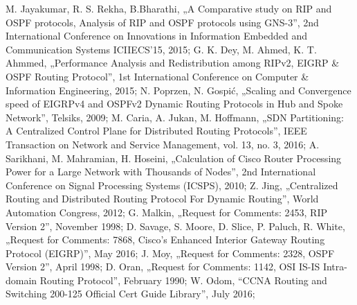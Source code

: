 \documentclass[conference,compsoc]{IEEEtran}
\begin{document}
\begin{thebibliography}{1}
M. Jayakumar, R. S. Rekha, B.Bharathi, „A Comparative study on RIP and OSPF protocols, Analysis of RIP and OSPF protocols using GNS-3”, 2nd International Conference on Innovations in Information Embedded and Communication Systems ICIIECS’15, 2015;
G. K. Dey, M. Ahmed, K. T. Ahmmed, „Performance Analysis and Redistribution among RIPv2, EIGRP \& OSPF Routing Protocol”, 1st International Conference on Computer \& Information Engineering, 2015;
N. Poprzen, N. Gospić, „Scaling and Convergence speed of EIGRPv4 and OSPFv2 Dynamic Routing Protocols in Hub and Spoke Network”, Telsiks, 2009;
M. Caria, A. Jukan, M. Hoffmann, „SDN Partitioning: A Centralized Control Plane for Distributed Routing Protocols”, IEEE Transaction on Network and Service Management, vol. 13, no. 3, 2016;
A. Sarikhani, M. Mahramian, H. Hoseini, „Calculation of Cisco Router Processing Power for a Large Network with Thousands of Nodes”, 2nd International Conference on Signal Processing Systems (ICSPS), 2010;
Z. Jing, „Centralized Routing and Distributed Routing Protocol For Dynamic Routing”, World Automation Congress, 2012;
G. Malkin, „Request for Comments: 2453, RIP Version 2”, November 1998;
D. Savage, S. Moore, D. Slice, P. Paluch, R. White, „Request for Comments: 7868, Cisco’s Enhanced Interior Gateway Routing Protocol (EIGRP)”, May 2016;
J. Moy, „Request for Comments: 2328, OSPF Version 2”, April 1998;
D. Oran, „Request for Comments: 1142, OSI IS-IS Intra-domain Routing Protocol”, February 1990;
W. Odom, “CCNA Routing and Switching 200-125 Official Cert Guide Library”, July 2016;


\end{thebibliography}




\end{document}
